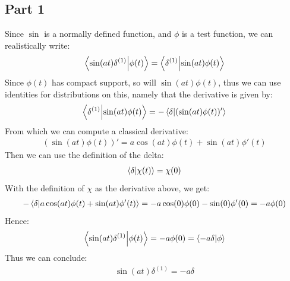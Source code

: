 \documentclass[12pt]{article}
\begin{document}
\subsection*{Part 1}
Since $\sin$ is a normally defined function, and $\phi$ is a test function, we can realistically write:
\begin{align*}
  \ip{\sin(at)\delta^{(1)}}{\phi(t)}=\ip{\delta^{(1)}}{\sin(at)\phi(t)}
\end{align*}
Since $\phi(t)$ has compact support, so will $\sin(at)\phi(t)$, thus we can use identities for distributions on this, namely that the derivative is given by:
\begin{align*}
  \ip{\delta^{(1)}}{\sin(at)\phi(t)}=-\ip{\delta}{(\sin(at)\phi(t))'}
\end{align*}
From which we can compute a classical derivative:
\begin{align*}
  (\sin(at)\phi(t))'=a\cos(at)\phi(t)+\sin(at)\phi'(t)
\end{align*}
Then we can use the definition of the delta:
\begin{align*}
  \ip{\delta}{\chi(t)}=\chi(0)
\end{align*}
With the definition of $\chi$ as the derivative above, we get:
\begin{align*}
  -\ip{\delta}{a\cos(at)\phi(t)+\sin(at)\phi'(t)}=
  -a\cos(0)\phi(0)-\sin(0)\phi'(0)=-a\phi(0)
\end{align*}
Hence:
\begin{align*}
  \ip{\sin(at)\delta^{(1)}}{\phi(t)}=-a\phi(0)=\ip{-a\delta}{\phi}
\end{align*}
Thus we can conclude:
\begin{align}
  \boxed{\sin(at)\delta^{(1)}=-a\delta}
\end{align}
\end{document}
